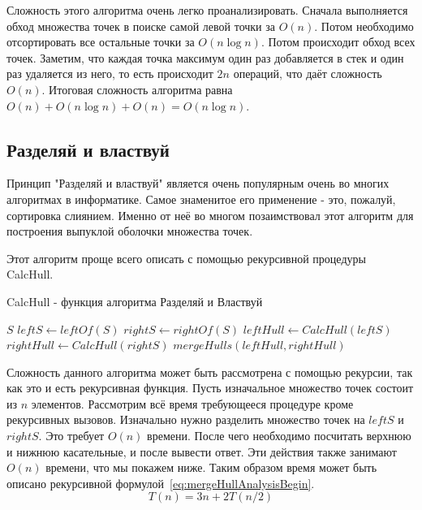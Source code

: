 Сложность этого алгоритма очень легко проанализировать. Сначала выполняется обход множества точек в поиске самой левой точки за $O(n)$. Потом необходимо отсортировать все остальные точки за $O(n \log n)$. Потом происходит обход всех точек. Заметим, что каждая точка максимум один раз добавляется в стек и один раз удаляется из него, то есть происходит $2n$ операций, что даёт сложность $O(n)$. Итоговая сложность алгоритма равна $O(n) + O(n \log n) + O(n) = O(n \log n)$.

\subsection{Разделяй и властвуй} \label{subsect1_1_3}

Принцип "Разделяй и властвуй" является очень популярным очень во многих алгоритмах в информатике. Самое знаменитое его применение - это, пожалуй, сортировка слиянием. Именно от неё во многом позаимствовал этот алгоритм для построения выпуклой оболочки множества точек.

Этот алгоритм проще всего описать с помощью рекурсивной процедуры CalcHull.

\begin{algorithm}[H]
	\caption{CalcHull - функция алгоритма Разделяй и Властвуй}
	\begin{algorithmic}[1]
			\Return $S$
		\EndIf
		\State $leftS\gets leftOf(S)$ 
		\State $rightS\gets rightOf(S)$ 
		\State $leftHull\gets CalcHull(leftS)$
		\State $rightHull\gets CalcHull(rightS)$
		\State
		\Return $mergeHulls(leftHull, rightHull)$
		\EndProcedure
	\end{algorithmic}
\end{algorithm}

Сложность данного алгоритма может быть рассмотрена с помощью рекурсии, так как это и есть рекурсивная функция. Пусть изначальное множество точек состоит из $n$ элементов. Рассмотрим всё время требующееся процедуре кроме рекурсивных вызовов. Изначально нужно разделить множество точек на $leftS$ и $rightS$. Это требует $O(n)$ времени. После чего необходимо посчитать верхнюю и нижнюю касательные, и после вывести ответ. Эти действия также занимают $O(n)$ времени, что мы покажем ниже. Таким образом время может быть описано рекурсивной формулой~\ref{eq:mergeHullAnalysisBegin}.
\begin{equation}\label{eq:mergeHullAnalysisBegin}
T(n) = 3n + 2T(n/2)
\end{equation}


